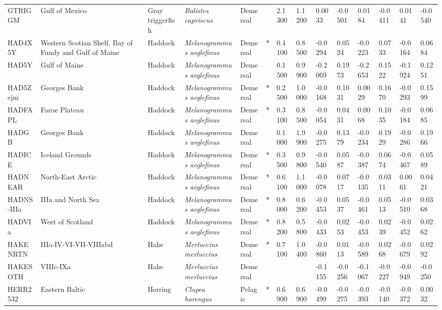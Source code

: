 \begin{longtable}{p{2.8cm}p{2cm}p{1.7cm}p{1.7cm}p{1cm}p{0.3cm}p{1cm}p{1cm}p{1cm}p{1cm}p{1cm}p{1cm}p{1cm}p{1cm}}
  GTRIGGM & Gulf of Mexico & Gray triggerfish & \textit{Balistes capriscus} & Demersal &   & 2.1300 & 1.1200 & 0.0033 & -0.0501 & 0.0184 & -0.0411 & 0.0141 & -0.0540 \\ 
  HAD4X5Y & Western Scotian Shelf, Bay of Fundy and Gulf of Maine & Haddock & \textit{Melanogrammus aeglefinus} & Demersal & * & 0.4100 & 0.8500 & -0.0294 & 0.0524 & -0.0223 & 0.0733 & -0.0164 & 0.0684 \\ 
  HAD5Y & Gulf of Maine & Haddock & \textit{Melanogrammus aeglefinus} & Demersal &   & 0.1500 & 0.9900 & -0.2069 & 0.1973 & -0.2653 & 0.1522 & -0.1924 & 0.1251 \\ 
  HAD5Zejm & Georges Bank & Haddock & \textit{Melanogrammus aeglefinus} & Demersal & * & 0.2500 & 1.0000 & -0.0168 & 0.1031 & 0.0029 & 0.1670 & -0.0293 & 0.1599 \\ 
  HADFAPL & Faroe Plateau & Haddock & \textit{Melanogrammus aeglefinus} & Demersal & * & 0.3100 & 0.8500 & -0.0054 & 0.0431 & 0.0068 & 0.1035 & -0.0184 & 0.0685 \\ 
  HADGB & Georges Bank & Haddock & \textit{Melanogrammus aeglefinus} & Demersal &   & 0.1000 & 1.9900 & -0.0275 & 0.1379 & -0.0234 & 0.1929 & -0.0286 & 0.1966 \\ 
  HADICE & Iceland Grounds & Haddock & \textit{Melanogrammus aeglefinus} & Demersal & * & 0.3500 & 0.9800 & -0.0540 & 0.0587 & -0.0387 & 0.0674 & -0.0467 & 0.0589 \\ 
  HADNEAR & North-East Arctic & Haddock & \textit{Melanogrammus aeglefinus} & Demersal & * & 0.6100 & 1.1000 & -0.0078 & 0.0717 & -0.0135 & 0.0311 & 0.0061 & 0.0421 \\ 
  HADNS-IIIa & IIIa and North Sea & Haddock & \textit{Melanogrammus aeglefinus} & Demersal & * & 0.8000 & 0.6200 & -0.0453 & 0.0537 & -0.0461 & 0.0513 & -0.0510 & 0.0368 \\ 
  HADVIa & West of Scotland & Haddock & \textit{Melanogrammus aeglefinus} & Demersal & * & 0.8200 & 0.5800 & -0.0433 & 0.0253 & -0.0453 & 0.0239 & -0.0452 & 0.0262 \\ 
  HAKENRTN & IIIa-IV-VI-VII-VIIIabd & Hake & \textit{Merluccius merluccius} & Demersal & * & 0.7100 & 1.0400 & -0.0860 & 0.0113 & -0.0589 & 0.0268 & -0.0679 & 0.0292 \\ 
  HAKESOTH & VIIIc-IXa & Hake & \textit{Merluccius merluccius} & Demersal &  &  &  & -0.1155 & -0.0256 & -0.1067 & -0.0227 & -0.0949 & -0.0250 \\ 
  HERR2532 & Eastern Baltic & Herring & \textit{Clupea harengus} & Pelagic & * & 0.6900 & 0.6900 & -0.0499 & -0.0275 & -0.0393 & -0.0140 & -0.0372 & 0.0032 \\ 

\end{longtable}
